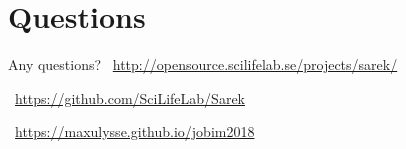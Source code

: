 \documentclass[usepdftitle=false]{beamer}
\begin{document}
{
	\section{Questions}
	\begin{frame}[plain]{Any questions?}
	\vspace{-6cm}
	\faGlobe\ \url{http://opensource.scilifelab.se/projects/sarek/}

	\faGithub\ \url{https://github.com/SciLifeLab/Sarek}

	\faGlobe\ \url{https://maxulysse.github.io/jobim2018}
	\end{frame}
}
\end{document}
